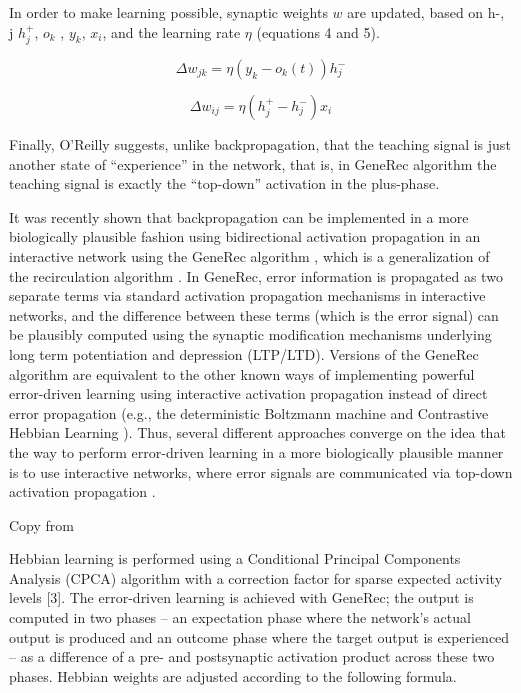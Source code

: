 In order to make learning possible, synaptic weights $w$ are updated, based on h-, j  $h^+_j$, $o_k$ , $y_k$, $x_i$, and the learning rate $\eta$ (equations 4 and 5).

$$\Delta w_{jk} = \eta(y_k - o_k(t)) h^-_j $$

$$\Delta w_{ij} = \eta(h^+_j - h^-_j) x_i$$

Finally, O’Reilly \citet{o1998six} suggests, unlike backpropagation, that the teaching signal is just another state of “experience” in the network, that is, in GeneRec algorithm the teaching signal is exactly the “top-down” activation in the plus-phase.


It was recently shown that backpropagation can be implemented in a more biologically plausible fashion using bidirectional activation propagation in an interactive network using the GeneRec algorithm \citet{o1996bio}, which is a generalization of the recirculation algorithm \citet{hinton1988learning}. In GeneRec, error information is propagated as two separate terms via standard activation propagation mechanisms in interactive networks, and the difference between these terms (which is the error signal) can be plausibly computed using the synaptic modification mechanisms underlying long term potentiation and depression (LTP/LTD). Versions of the GeneRec algorithm are equivalent to the other known ways of implementing powerful error-driven learning using interactive activation propagation instead of direct error propagation (e.g., the deterministic Boltzmann machine \citet{hinton1989deterministic} and Contrastive Hebbian Learning \citet{movellan1990contrastive}). Thus, several different approaches converge on the idea that the way to perform error-driven learning in a more biologically plausible manner is to use interactive networks, where error signals are communicated via top-down activation propagation \citet{o2001generalization}.

Copy from \citet{da2011advances} 


Hebbian learning is performed using a Conditional Principal Components Analysis (CPCA) algorithm with a correction factor for sparse expected activity levels [3]. The error-driven learning is achieved with GeneRec; the output is computed in two phases – an expectation phase where the network's actual output is produced and an outcome phase where the target output is experienced – as a difference of a pre- and postsynaptic activation product across these two phases. Hebbian weights are adjusted according to the following formula.

